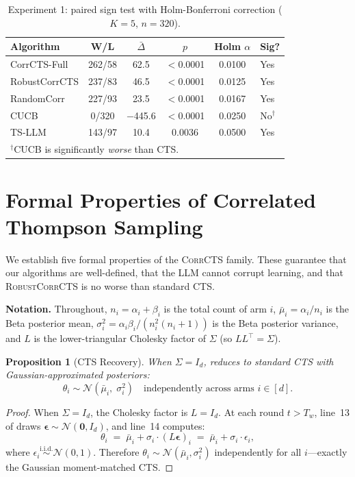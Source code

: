 \documentclass{article}
\theoremstyle{plain}
\newtheorem{proposition}[theorem]{Proposition}
\theoremstyle{definition}
\theoremstyle{remark}
\newcommand{\CorrCTS}{\textsc{CorrCTS}}
\newcommand{\RobustCorr}{\textsc{RobustCorrCTS}}
\begin{document}
\begin{table}[h]
\caption{Experiment 1: paired sign test with Holm-Bonferroni correction ($K = 5$, $n = 320$).}
\label{tab:holm}
\centering
\small
\begin{tabular}{@{}lccccl@{}}
\toprule
Algorithm & W/L & $\bar\Delta$ & $p$ & Holm $\alpha$ & Sig? \\
\midrule
CorrCTS-Full & 262/58 & 62.5 & ${<}$0.0001 & 0.0100 & Yes \\
RobustCorrCTS & 237/83 & 46.5 & ${<}$0.0001 & 0.0125 & Yes \\
RandomCorr & 227/93 & 23.5 & ${<}$0.0001 & 0.0167 & Yes \\
CUCB & 0/320 & $-$445.6 & ${<}$0.0001 & 0.0250 & No$^\dagger$ \\
TS-LLM & 143/97 & 10.4 & 0.0036 & 0.0500 & Yes \\
\bottomrule
\multicolumn{6}{l}{\footnotesize $^\dagger$CUCB is significantly \emph{worse} than CTS.}
\end{tabular}
\end{table}

\section{Formal Properties of Correlated Thompson Sampling}\label{app:proofs}

We establish five formal properties of the \CorrCTS{} family.
These guarantee that our algorithms are well-defined, that the LLM cannot corrupt learning, and that \RobustCorr{} is no worse than standard CTS.

\textbf{Notation.}
Throughout, $n_i = \alpha_i + \beta_i$ is the total count of arm $i$,
$\bar\mu_i = \alpha_i / n_i$ is the Beta posterior mean,
$\sigma_i^2 = \alpha_i \beta_i / (n_i^2 (n_i + 1))$ is the Beta posterior variance,
and $L$ is the lower-triangular Cholesky factor of $\Sigma$ (so $LL^\top = \Sigma$).

\medskip

\begin{proposition}[CTS Recovery]\label{prop:recovery}
When $\Sigma = I_d$,  reduces to standard CTS with Gaussian-approximated posteriors:
\[
\theta_i \sim \mathcal{N}(\bar\mu_i,\; \sigma_i^2) \quad \text{independently across arms } i \in [d].
\]
\end{proposition}

\begin{proof}
When $\Sigma = I_d$, the Cholesky factor is $L = I_d$.
At each round $t > T_w$, line~13 of  draws $\boldsymbol{\epsilon} \sim \mathcal{N}(\mathbf{0}, I_d)$, and line~14 computes:
\[
\theta_i \;=\; \bar\mu_i + \sigma_i \cdot (L\boldsymbol{\epsilon})_i
      \;=\; \bar\mu_i + \sigma_i \cdot \epsilon_i,
\]
where $\epsilon_i \overset{\text{i.i.d.}}{\sim} \mathcal{N}(0, 1)$.
Therefore $\theta_i \sim \mathcal{N}(\bar\mu_i, \sigma_i^2)$ independently for all $i$---exactly the Gaussian moment-matched CTS.
\end{proof}
\end{document}
